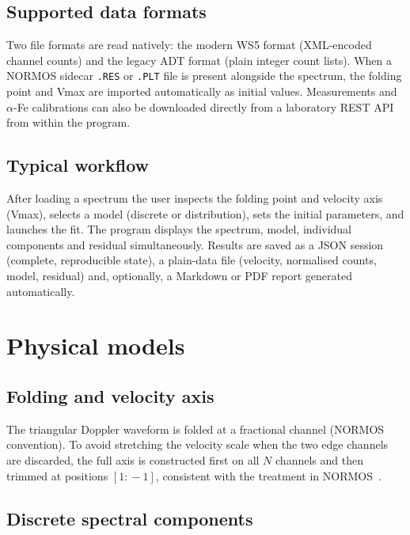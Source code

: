 \documentclass[smallcondensed]{svjour3}
\begin{document}
\subsection{Supported data formats}
\label{sec:formats}

Two file formats are read natively: the modern WS5 format (XML-encoded
channel counts) and the legacy ADT format (plain integer count lists). When
a NORMOS sidecar \texttt{.RES} or \texttt{.PLT} file is present alongside
the spectrum, the folding point and Vmax are imported automatically as
initial values. Measurements and $\alpha$-Fe calibrations can also be
downloaded directly from a laboratory REST API from within the program.

\subsection{Typical workflow}
\label{sec:workflow}

After loading a spectrum the user inspects the folding point and velocity
axis (Vmax), selects a model (discrete or distribution), sets the initial
parameters, and launches the fit. The program displays the spectrum, model,
individual components and residual simultaneously. Results are saved as a
JSON session (complete, reproducible state), a plain-data file (velocity,
normalised counts, model, residual) and, optionally, a Markdown or PDF
report generated automatically.

\section{Physical models}
\label{sec:models}

\subsection{Folding and velocity axis}
\label{sec:folding}

The triangular Doppler waveform is folded at a fractional channel
(NORMOS convention). To avoid stretching the velocity scale when the two
edge channels are discarded, the full axis is constructed first on all $N$
channels and then trimmed at positions $[1\!:\!-1]$, consistent with the
treatment in NORMOS~\cite{normos}.

\subsection{Discrete spectral components}
\label{sec:discrete}
\end{document}
